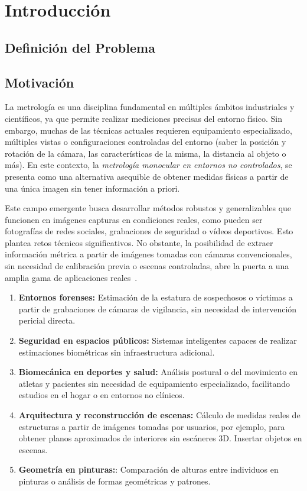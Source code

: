 \chapter{Introducción}
\section{Definición del Problema}   
\section{Motivación}
La metrología es una disciplina fundamental en múltiples ámbitos industriales y científicos, ya que permite realizar mediciones precisas del entorno físico. 
Sin embargo, muchas de las técnicas actuales requieren equipamiento especializado, múltiples vistas o configuraciones controladas del entorno (saber la posición y rotación de la cámara, las características de la misma, la distancia al objeto o más).
En este contexto, la \emph{metrología monocular en entornos no controlados}, se presenta como una alternativa asequible de obtener medidas físicas a partir de una única imagen
sin tener información a priori.
\par
Este campo emergente busca desarrollar métodos robustos y generalizables que funcionen en imágenes capturas en condiciones reales, como pueden ser 
fotografías de redes sociales, grabaciones de seguridad o vídeos deportivos. Esto plantea retos técnicos significativos.
No obstante, la posibilidad de extraer información métrica a partir de imágenes tomadas con cámaras convencionales, sin necesidad de calibración previa o escenas controladas, 
abre la puerta a una amplia gama de aplicaciones reales~\cite{HoiemPopUp,HoiemObjectsInPerspective,CriminisiApplications, CriminisiReconstruction, CriminisiPaintings, SingleViewExerciseQuantification}. 
\begin{enumerate}
    \item \textbf{Entornos forenses:} Estimación de la estatura de sospechosos o víctimas a partir de grabaciones de cámaras de vigilancia, sin necesidad de intervención pericial directa.
    \item \textbf{Seguridad en espacios públicos:} Sistemas inteligentes capaces de realizar estimaciones biométricas sin infraestructura adicional.
    \item \textbf{Biomecánica en deportes y salud:} Análisis postural o del movimiento en atletas y pacientes sin necesidad de equipamiento especializado, facilitando estudios en el hogar o en entornos no clínicos.
    \item \textbf{Arquitectura y reconstrucción de escenas:} Cálculo de medidas reales de estructuras a partir de imágenes tomadas por usuarios, por ejemplo, para obtener planos aproximados de interiores sin escáneres 3D. Insertar objetos en escenas.
	\item \textbf{Geometría en pinturas:}: Comparación de alturas entre individuos en pinturas o análisis de formas geométricas y patrones.
\end{enumerate}

